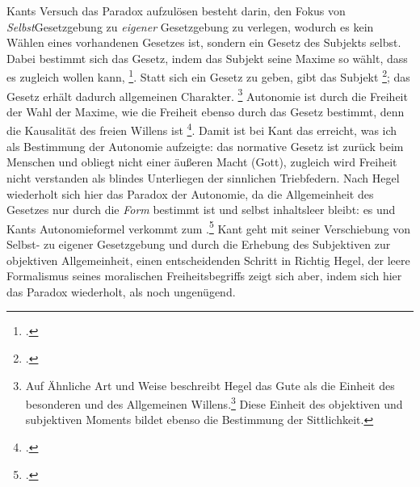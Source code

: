 \documentclass[12pt, a4paper, openany]{report}
\begin{document}
Kants Versuch das Paradox aufzulösen besteht darin, den Fokus von \emph{Selbst}\-Gesetzgebung zu \emph{eigener} Gesetzgebung zu verlegen, wodurch es kein Wählen eines vorhandenen Gesetzes ist, sondern ein Gesetz des Subjekts selbst.
Dabei bestimmt sich das Gesetz, indem das Subjekt seine Maxime so wählt, dass es zugleich wollen kann, \footcite[][51]{kant_kritik_2014}. 
Statt sich ein Gesetz zu geben, gibt das Subjekt \footcite[][24]{menke_autonomie_2018}; das Gesetz erhält dadurch allgemeinen Charakter.%
\footnote{
    \cite[Vgl.][65.]{kant_kritik_2014} 
    Auf Ähnliche Art und Weise beschreibt Hegel das Gute als die Einheit des besonderen und des Allgemeinen Willens.\footcite[Vgl.][§129, S. 134.]{hegel_grundlinien_2017}
    Diese Einheit des objektiven und subjektiven Moments bildet ebenso die Bestimmung der Sittlichkeit.
}
Autonomie ist durch die Freiheit der Wahl der Maxime, wie die Freiheit ebenso durch das Gesetz bestimmt, denn die Kausalität des freien Willens ist \footcite[][81]{kant_kritik_2014}.
Damit ist bei Kant das erreicht, was ich als Bestimmung der Autonomie aufzeigte: 
das normative Gesetz ist zurück beim Menschen und obliegt nicht einer äußeren Macht (Gott), zugleich wird Freiheit nicht verstanden als blindes Unterliegen der sinnlichen Triebfedern. 
Nach Hegel wiederholt sich hier das Paradox der Autonomie, da die Allgemeinheit des Gesetzes nur durch die \emph{Form} bestimmt ist und selbst inhaltsleer bleibt:
es  und Kants Autonomieformel verkommt zum .\footcite[][§135, S. 139.]{hegel_grundlinien_2017}
Kant geht mit seiner Verschiebung von Selbst- zu eigener Gesetzgebung und durch die Erhebung des Subjektiven zur objektiven Allgemeinheit, einen entscheidenden Schritt in Richtig Hegel, der leere Formalismus seines moralischen Freiheitsbegriffs zeigt sich aber, indem sich hier das Paradox wiederholt, als noch ungenügend.\\
\end{document}
